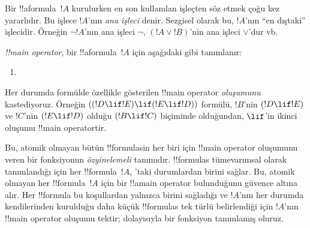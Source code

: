 



\begin{explain}
Bir !!a{formula}~$!A$ kurulurken en son kullanılan işleçten söz etmek
çoğu kez yararlıdır. Bu işlece $!A$'nın \emph{ana işleci} denir.
Sezgisel olarak bu, $!A$'nın ``en dıştaki'' işlecidir. Örneğin
$\lnot !A$'nın ana işleci $\lnot$, $(!A \lor !B)$'nin ana işleci
$\lor$'dur vb.
\end{explain}


\begin{defn}
\emph{!!{main operator}}, bir !!a{formula}~$!A$ için aşağıdaki gibi
tanımlanır:
\begin{enumerate}
\item {}







\end{enumerate}
\end{defn}

Her durumda formülde özellikle gösterilen !!{main operator}
\emph{oluşumunu} kastediyoruz. Örneğin $((!D \lif !E) \lif (!E \lif
!D))$ formülü, $!B$'nin $(!D \lif !E)$ ve $!C$'nin $(!E \lif !D)$
olduğu $(!B \lif !C)$ biçiminde olduğundan, $\lif$'in ikinci oluşumu
!!{main operator}{}tir.

\begin{explain}
Bu, atomik olmayan bütün !!{formula}s{}in her biri için !!{main operator}
oluşumunu veren bir fonksiyonun \emph{özyinelemeli} tanımıdır.
!!{formula}s tümevarımsal olarak tanımlandığı için her
!!{formula}~$!A$, 'taki durumlardan birini sağlar.
Bu, atomik olmayan her !!{formula}~$!A$ için bir !!a{main
  operator} bulunduğunu güvence altına alır. Her !!{formula} bu
koşullardan yalnızca birini sağladığı ve $!A$'nın her durumda kendilerinden
kurulduğu daha küçük !!{formula}s tek türlü belirlendiği için $!A$'nın
!!{main
  operator} oluşumu tektir; dolayısıyla bir fonksiyon tanımlamış oluruz.
\end{explain}

